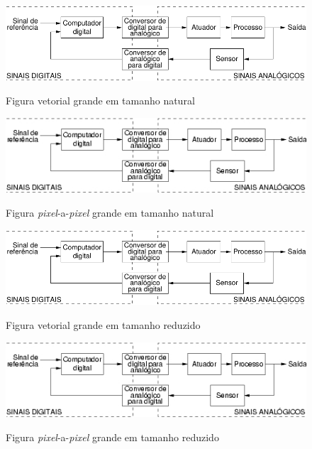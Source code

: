 \begin{figure}[htbp!] \begin{center}
\includegraphics{./figuras/bigvetorial}
\caption{Figura vetorial grande em tamanho natural}
\vspace{6mm}
\label{Fig:bigvetorial}
\includegraphics{./figuras/bigbitmap}
\caption{Figura \emph{pixel}-a-\emph{pixel} grande em tamanho natural}
\label{Fig:bigbitmap}
\vspace{6mm}
\includegraphics[scale=0.5]{./figuras/bigvetorial}
\caption{Figura vetorial grande em tamanho reduzido}
\label{Fig:bigvetorialreduzida}
\vspace{6mm}
\includegraphics[scale=0.5]{./figuras/bigbitmap}
\caption{Figura \emph{pixel}-a-\emph{pixel} grande em tamanho reduzido}
\label{Fig:bigbitmapreduzida}
\end{center} \end{figure}

